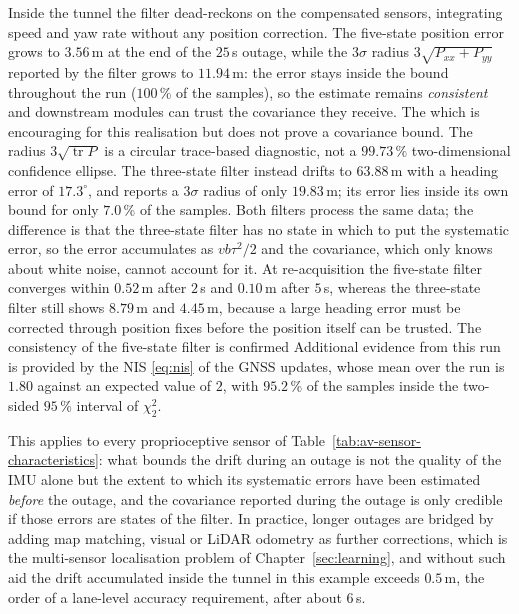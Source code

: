 \documentclass[graybox,envcountchap]{style/SNmono}
\DeclareMathOperator{\tr}{tr}
\providecommand{\DIFadd}[1]{{\protect\color{blue} #1}} %
\providecommand{\DIFdel}[1]{{\protect\color{red} #1}} %
\providecommand{\DIFaddbegin}{} %
\providecommand{\DIFaddend}{} %
\providecommand{\DIFdelbegin}{} %
\providecommand{\DIFdelend}{} %
\begin{document}
\begin{example}
Inside the tunnel the filter dead-reckons on the compensated sensors, integrating speed and yaw rate without any position correction. The five-state position error grows to $3.56$\,m at the end of the $25$\,s outage, while the $3\sigma$ radius $3\sqrt{P_{xx}+P_{yy}}$ reported by the filter grows to $11.94$\,m: the error stays inside the bound throughout the run ($100$\,\% of the samples), \DIFdelbegin \DIFdel{so the estimate remains }\emph{\DIFdel{consistent}} %
\DIFdel{and downstream modules can trust the covariance they receive. The }\DIFdelend \DIFaddbegin \DIFadd{which is encouraging for this realisation but does not prove a covariance bound. The radius $3\sqrt{\tr P}$ is a circular trace-based diagnostic, not a $99.73\,\%$ two-dimensional confidence ellipse. The }\DIFaddend three-state filter instead drifts to $63.88$\,m with a heading error of $17.3^{\circ}$, and reports a $3\sigma$ radius of only $19.83$\,m; its error lies inside its own bound for only $7.0$\,\% of the samples. Both filters process the same data; the difference is that the three-state filter has no state in which to put the systematic error, so the error accumulates as $vb\tau^{2}/2$ and the covariance, which only knows about white noise, cannot account for it. At re-acquisition the five-state filter converges within $0.52$\,m after $2$\,s and $0.10$\,m after $5$\,s, whereas the three-state filter still shows $8.79$\,m and $4.45$\,m, because a large heading error must be corrected through position fixes before the position itself can be trusted. \DIFdelbegin \DIFdel{The consistency of the five-state filter is confirmed }\DIFdelend \DIFaddbegin \DIFadd{Additional evidence from this run is provided }\DIFaddend by the NIS \eqref{eq:nis} of the GNSS updates, whose mean over the run is $1.80$ against an expected value of $2$, with $95.2$\,\% of the samples inside the two-sided $95$\,\% interval of $\chi^{2}_{2}$.

This applies to every proprioceptive sensor of Table~\ref{tab:av-sensor-characteristics}: what bounds the drift during an outage is not the quality of the IMU alone but the extent to which its systematic errors have been estimated \emph{before} the outage, and the covariance reported during the outage is only credible if those errors are states of the filter. In practice, longer outages are bridged by adding map matching, visual or LiDAR odometry as further corrections, which is the multi-sensor localisation problem of Chapter~\ref{sec:learning}, and without such aid the drift accumulated inside the tunnel in this example exceeds $0.5$\,m, the order of a lane-level accuracy requirement, after about $6$\,s.
\end{example}
\end{document}

